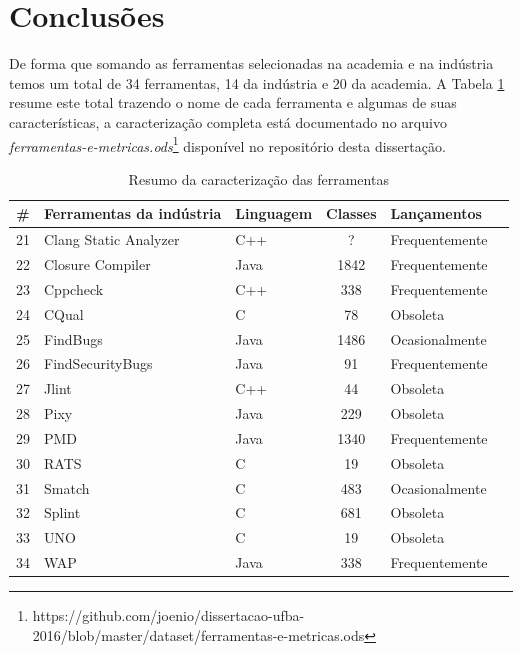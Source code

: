 \section{Conclusões}


De forma que somando as ferramentas selecionadas na academia e na indústria
temos um total de 34 ferramentas, 14 da indústria e 20 da academia.  A Tabela
\ref{total-de-ferramentas} resume este total trazendo o nome de cada ferramenta
e algumas de suas características, a caracterização completa está documentado
no arquivo {\it
ferramentas-e-metricas.ods}\footnote{https://github.com/joenio/dissertacao-ufba-2016/blob/master/dataset/ferramentas-e-metricas.ods}
disponível no repositório desta dissertação.

\begin{table}[H]
  \caption{Resumo da caracterização das ferramentas}
  \centering
  \begin{tabular}{| c | l | l | c | l | l |}
    \hline
    \# & Ferramentas da indústria & Linguagem & Classes & Lançamentos \\
    \hline
    21 & Clang Static Analyzer    & C++   & ?     & Frequentemente \\
    22 & Closure Compiler         & Java  & 1842  & Frequentemente \\
    23 & Cppcheck                 & C++   & 338   & Frequentemente \\
    24 & CQual                    & C     & 78    & Obsoleta       \\
    25 & FindBugs                 & Java  & 1486  & Ocasionalmente \\
    26 & FindSecurityBugs         & Java  & 91    & Frequentemente \\
    27 & Jlint                    & C++   & 44    & Obsoleta       \\
    28 & Pixy                     & Java  & 229   & Obsoleta       \\
    29 & PMD                      & Java  & 1340  & Frequentemente \\
    30 & RATS                     & C     & 19    & Obsoleta       \\
    31 & Smatch                   & C     & 483   & Ocasionalmente \\
    32 & Splint                   & C     & 681   & Obsoleta       \\
    33 & UNO                      & C     & 19    & Obsoleta       \\
    34 & WAP                      & Java  & 338   & Frequentemente \\
    \hline
  \end{tabular}
  \label{total-de-ferramentas}
\end{table}

